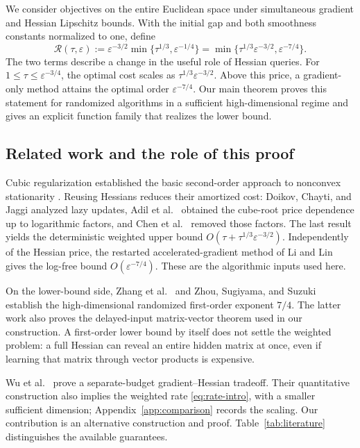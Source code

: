 \documentclass[11pt]{article}
\theoremstyle{definition}
\theoremstyle{remark}
\newcommand{\eps}{\varepsilon}
\newcommand{\Rate}{\mathcal R}
\begin{document}
We consider objectives on the entire Euclidean space under simultaneous
gradient and Hessian Lipschitz bounds. With the initial gap and both
smoothness constants normalized to one, define
\begin{equation}\label{eq:rate-intro}
 \Rate(\tau,\eps)
 :=\eps^{-3/2}\min\{\tau^{1/3},\eps^{-1/4}\}
 =\min\{\tau^{1/3}\eps^{-3/2},\eps^{-7/4}\}.
\end{equation}
The two terms describe a change in the useful role of Hessian queries.
For $1\le\tau\le\eps^{-3/4}$, the optimal cost scales as
$\tau^{1/3}\eps^{-3/2}$. Above this price, a gradient-only method attains
the optimal order $\eps^{-7/4}$. Our main theorem proves this statement
for randomized algorithms in a sufficient high-dimensional regime and
gives an explicit function family that realizes the lower bound.

\subsection{Related work and the role of this proof}
Cubic regularization established the basic second-order approach to
nonconvex stationarity \cite{nesterovpolyak}. Reusing Hessians reduces their
amortized cost: Doikov, Chayti, and Jaggi \cite{doikov} analyzed lazy
updates, Adil et al.\ \cite{adil} obtained the cube-root price dependence
up to logarithmic factors, and Chen et al.\ \cite[Theorem 4.1]{chen}
removed those factors. The last result yields the deterministic weighted
upper bound $O(\tau+\tau^{1/3}\eps^{-3/2})$. Independently of the Hessian
price, the restarted accelerated-gradient method of Li and Lin
\cite[Theorem 1]{lilin} gives the log-free bound $O(\eps^{-7/4})$.
These are the algorithmic inputs used here.

On the lower-bound side, Zhang et al.\ \cite[Theorem 3.1]{zhang} and
Zhou, Sugiyama, and Suzuki \cite[Theorem 6.1, $p=2$]{zhou} establish the
high-dimensional randomized first-order exponent $7/4$. The latter
work also proves the delayed-input matrix-vector theorem used in our
construction. A first-order lower bound by itself does not settle the
weighted problem: a full Hessian can reveal an entire hidden matrix at
once, even if learning that matrix through vector products is expensive.

Wu et al.\ \cite{wu} prove a separate-budget gradient--Hessian tradeoff.
Their quantitative construction also implies the weighted rate
\eqref{eq:rate-intro}, with a smaller sufficient dimension; Appendix~\ref{app:comparison}
records the scaling. Our contribution is an alternative construction
and proof. Table~\ref{tab:literature}
distinguishes the available guarantees.
\end{document}
